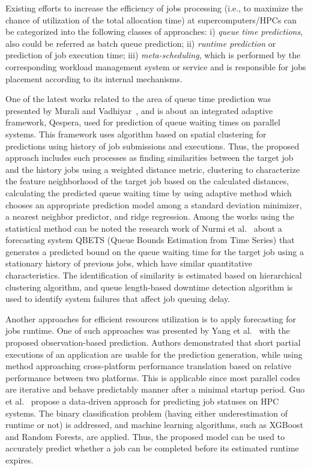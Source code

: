 Existing efforts to increase the efficiency of jobs processing (i.e., to
maximize the chance of utilization of the total allocation time) at
supercomputers/HPCs can be categorized into the following classes of
approaches:
i) \textit{queue time predictions}, also could be referred as batch queue
prediction;
ii) \textit{runtime prediction} or prediction of job execution time;
iii) \textit{meta-scheduling}, which is performed by the corresponding workload
management system or service and is responsible for jobs placement according to
its internal mechanisms.

One of the latest works related to the area of queue time prediction was
presented by Murali and Vadhiyar~\cite{ref-qespera}, and is about an integrated
adaptive framework, Qespera, used for prediction of queue waiting times on
parallel systems.
This framework uses algorithm based on spatial clustering for predictions using
history of job submissions and executions.
Thus, the proposed approach includes such processes as finding similarities
between the target job and the history jobs using a weighted distance metric,
clustering to characterize the feature neighborhood of the target job based on
the calculated distances, calculating the predicted queue waiting time by using
adaptive method which chooses an appropriate prediction model among a standard
deviation minimizer, a nearest neighbor predictor, and ridge regression.
Among the works using the statistical method can be noted the research work of
Nurmi et al.~\cite{ref-qbets} about a forecasting system QBETS (Queue Bounds
Estimation from Time Series) that generates a predicted bound on the queue
waiting time for the target job using a stationary history of previous jobs,
which have similar quantitative characteristics.
The identification of similarity is estimated based on hierarchical clustering
algorithm, and queue length-based downtime detection algorithm is used to
identify system failures that affect job queuing delay.

Another approaches for efficient resources utilization is to apply forecasting
for jobs runtime.
One of such approaches was presented by Yang et al.~\cite{ref-yang} with the
proposed observation-based prediction.
Authors demonstrated that short partial executions of an application are usable
for the prediction generation, while using method approaching cross-platform
performance translation based on relative performance between two platforms.
This is applicable since most parallel codes are iterative and behave
predictably manner after a minimal startup period.
Guo et al.~\cite{ref-guo} propose a data-driven approach for predicting job
statuses on HPC systems.
The binary classification problem (having either underestimation of runtime or
not) is addressed, and machine learning algorithms, such as XGBoost and Random
Forests, are applied.
Thus, the proposed model can be used to accurately predict whether a job can be
completed before its estimated runtime expires.


